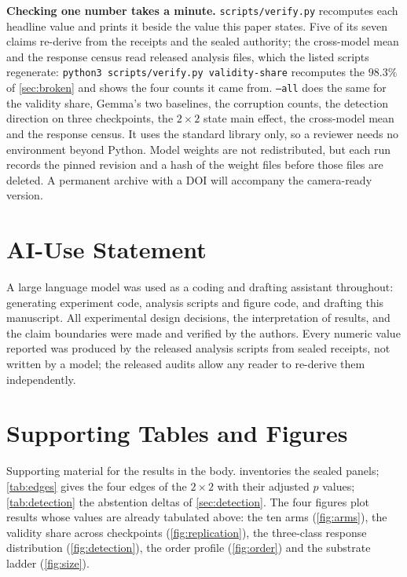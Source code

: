 \documentclass[10pt,twocolumn]{article}
\begin{document}
\textbf{Checking one number takes a minute.} \texttt{scripts/verify.py} recomputes each headline value and prints it beside the
value this paper states. Five of its seven claims re-derive from the receipts and
the sealed authority; the cross-model mean and the response census read released
analysis files, which the listed scripts regenerate:
\texttt{python3 scripts/verify.py validity-share} recomputes the $98.3\%$ of
\cref{sec:broken} and shows the four counts it came from.
\texttt{--all} does the same for the validity share, Gemma's two baselines, the
corruption counts, the detection direction on three checkpoints, the $2\times2$
state main effect, the cross-model mean and the response census. It uses the
standard library only, so a reviewer needs no environment beyond Python. Model weights are not redistributed, but each run records the
pinned revision and a hash of the weight files before those files are deleted. A
permanent archive with a DOI will accompany the camera-ready version.

\section*{AI-Use Statement}

A large language model was used as a coding and drafting assistant throughout:
generating experiment code, analysis scripts and figure code, and drafting this
manuscript. All experimental design decisions, the interpretation of results,
and the claim boundaries were made and verified by the authors. Every numeric
value reported was produced by the released analysis scripts from sealed
receipts, not written by a model; the released audits allow any reader to
re-derive them independently.





\appendix
\section{Supporting Tables and Figures}

Supporting material for the results in the body.  inventories the sealed panels; \cref{tab:edges} gives the four edges of the $2\times2$ with their adjusted $p$ values; \cref{tab:detection} the abstention deltas of \cref{sec:detection}. The four figures plot results whose values are already tabulated above: the ten arms (\cref{fig:arms}), the validity share across checkpoints (\cref{fig:replication}), the three-class response distribution (\cref{fig:detection}), the order profile (\cref{fig:order}) and the substrate ladder (\cref{fig:size}).
\end{document}
